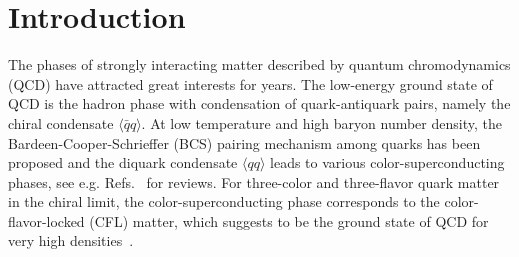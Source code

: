 \documentclass[prd, showpacs,nofootinbib,amsmath,amssymb,12pt]{revtex4}
\begin{document}
\section{Introduction}
The phases of strongly interacting matter described by quantum chromodynamics (QCD) have attracted great interests for years.
The low-energy ground state of QCD is the hadron phase with condensation of quark-antiquark pairs,
namely the chiral condensate $\langle\bar{q}q\rangle$.
At low temperature and high baryon number density,
the Bardeen-Cooper-Schrieffer (BCS) pairing mechanism among quarks has been proposed and the diquark condensate $\langle qq\rangle$ leads to various color-superconducting phases, see e.g. Refs.~\cite{alford2004dense,alford1998qcd} for reviews.
For three-color and three-flavor quark matter in the chiral limit, the color-superconducting phase corresponds to the color-flavor-locked (CFL)  matter,
which suggests to be the ground state of QCD for very high densities~\cite{alford1998qcd}.
\end{document}
